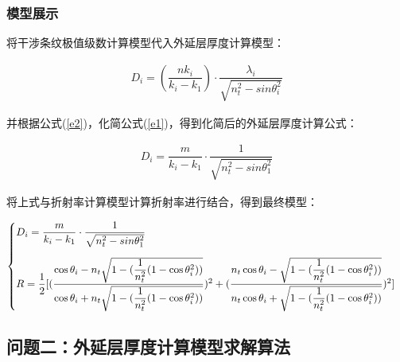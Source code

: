 \documentclass[UTF8]{ctexart}
\begin{document}
 \subsubsection{模型展示}
 将干涉条纹极值级数计算模型代入外延层厚度计算模型：\par 
 \vspace{-1cm}
  \begin{align}
 	D_i=(\dfrac{nk_i}{k_i-k_1})\cdot\dfrac{\lambda_i}{\sqrt{n_t^2-sin\theta_i^2}}
 	\label{e1}
 \end{align}\par
 并根据公式(\ref{e2})，化简公式(\ref{e1})，得到化简后的外延层厚度计算公式：\par 
  \vspace{-1cm}
 \begin{align}
 	D_i=\dfrac{m}{k_i-k_1}\cdot\dfrac{1}{\sqrt{n_t^2-sin\theta_1^2}}
 \end{align}\par 
 将上式与折射率计算模型计算折射率进行结合，得到最终模型：\par 
 \begin{align}
 	\begin{cases}
 			D_i=\dfrac{m}{k_i-k_1}\cdot\dfrac{1}{\sqrt{n_t^2-sin\theta_1^2}}\\
 		\addlinespace
 		\addlinespace 
 			R=\dfrac{1}{2}[(\dfrac{\cos\theta_i-n_t\sqrt{1-(\dfrac{1}{n_t^2}(1-\cos\theta_i^2))}}{\cos\theta_i+n_t\sqrt{1-(\dfrac{1}{n_t^2}(1-\cos\theta_i^2))}})^2+(\dfrac{n_t\cos\theta_i-\sqrt{1-(\dfrac{1}{n_t^2}(1-\cos\theta_i^2))}}{n_t\cos\theta_i+\sqrt{1-(\dfrac{1}{n_t^2}(1-\cos\theta_i^2))}})^2]
 	\end{cases}
 \end{align}
\subsection{问题二：外延层厚度计算模型求解算法}
\end{document}
